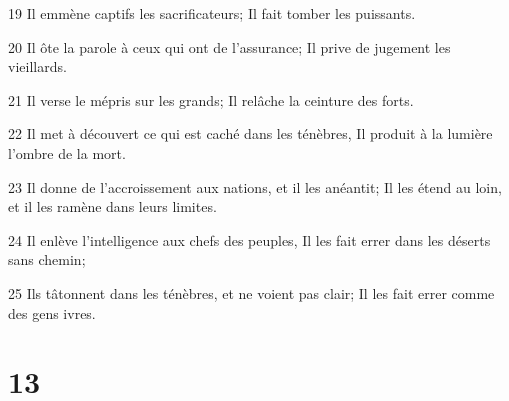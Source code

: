 \par 19 Il emmène captifs les sacrificateurs; Il fait tomber les puissants.
\par 20 Il ôte la parole à ceux qui ont de l'assurance; Il prive de jugement les vieillards.
\par 21 Il verse le mépris sur les grands; Il relâche la ceinture des forts.
\par 22 Il met à découvert ce qui est caché dans les ténèbres, Il produit à la lumière l'ombre de la mort.
\par 23 Il donne de l'accroissement aux nations, et il les anéantit; Il les étend au loin, et il les ramène dans leurs limites.
\par 24 Il enlève l'intelligence aux chefs des peuples, Il les fait errer dans les déserts sans chemin;
\par 25 Ils tâtonnent dans les ténèbres, et ne voient pas clair; Il les fait errer comme des gens ivres.

\chapter{13}

